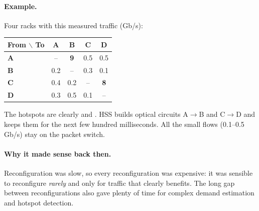 \paragraph{Example.} Four racks with this measured traffic (Gb/s):
\begin{center}
\begin{tabular}{@{}lcccc@{}}
\toprule
\textbf{From $\backslash$ To} & \textbf{A} & \textbf{B} & \textbf{C} & \textbf{D} \\
\midrule
\textbf{A} & -- & \textbf{9} & 0.5 & 0.5 \\
\textbf{B} & 0.2 & -- & 0.3 & 0.1 \\
\textbf{C} & 0.4 & 0.2 & -- & \textbf{8} \\
\textbf{D} & 0.3 & 0.5 & 0.1 & -- \\
\bottomrule
\end{tabular}
\end{center}
The hotspots are clearly  and . HSS builds optical circuits A$\to$B and C$\to$D and keeps them for the next few hundred milliseconds. All the small flows (0.1--0.5\,Gb/s) stay on the packet switch.

\paragraph{Why it made sense back then.} Reconfiguration was slow, so every reconfiguration was expensive: it was sensible to reconfigure \emph{rarely} and only for traffic that clearly benefits. The long gap between reconfigurations also gave plenty of time for complex demand estimation and hotspot detection.

